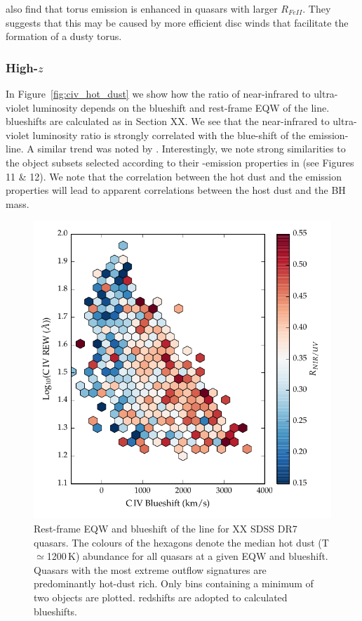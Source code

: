 \citet{shen14} also find that torus emission is enhanced in quasars with larger $R_{FeII}$.
They suggests that this may be caused by more efficient disc winds that facilitate the formation of a dusty torus. 

\subsubsection{High-$z$}

In Figure~\ref{fig:civ_hot_dust} we show how the ratio of near-infrared to ultra-violet luminosity depends on the blueshift and rest-frame EQW of the  line.
 blueshifts are calculated as in Section XX. 
We see that the near-infrared to ultra-violet luminosity ratio is strongly correlated with the blue-shift of the  emission-line. 
A similar trend was noted by \citet{wang13}. 
Interestingly, we note strong similarities to the object subsets selected according to their -emission properties in \citet{richards11} (see Figures 11 \& 12).  
We note that the correlation between the hot dust and the  emission properties will lead to apparent correlations between the host dust and the BH mass. 
 
\begin{figure}
\centering
  \includegraphics[width=\columnwidth]{figures/chapter05/hot_dust_ratio.pdf}
\caption[{Hot dust abundance as a function of rest-frame EQW and blueshift of the  line.}]{Rest-frame EQW and blueshift of the  line for XX SDSS DR7 quasars. The colours of the hexagons denote the median hot dust (T$\simeq$1200\,K) abundance for all quasars at a given EQW and blueshift. Quasars with the most extreme outflow signatures are predominantly hot-dust rich. Only bins containing a minimum of two objects are plotted. \citet{hewett10} redshifts are adopted to calculated  blueshifts.}
  \label{fig:hot_dust_beta}
\end{figure}

